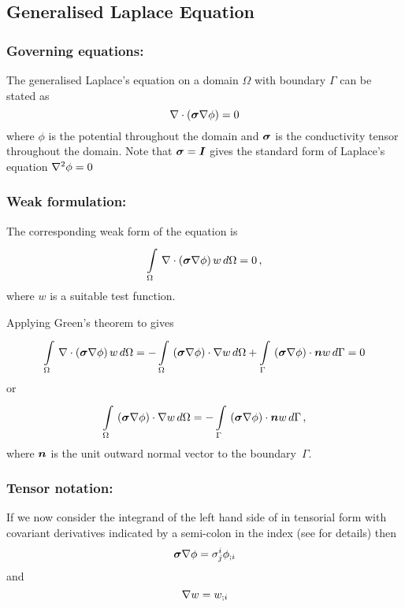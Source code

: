 \subsection{Generalised Laplace Equation}

\subsubsection{Governing equations:}
The generalised Laplace's equation on a domain $\Omega$ with boundary $\Gamma$
can be stated as
\begin{equation}
   \nabla\cdot\left( \boldsymbol{\sigma}\nabla \phi \right) =0
  \label{eqn:Laplacesequation}
\end{equation}
where $\phi$ is the potential throughout the domain and $\boldsymbol{\sigma}$ is
the conductivity tensor throughout the domain. Note that 
$\boldsymbol{\sigma}=\boldsymbol{I}$ gives the standard form of Laplace's equation \ie $\nabla^{2} {\phi}=0$

\subsubsection{Weak formulation:}
The corresponding weak form of the equation  is
\begin{equation}
    \displaystyle\int\limits_{\Omega}^{} \, \nabla\cdot\left( \boldsymbol{\sigma}\nabla \phi \right) w\,d\Omega =0 \,,
  \label{eqn:Laplaceweakform}
\end{equation}
where $w$ is a suitable test function.

Applying Green's theorem to  gives
\begin{equation}
 \gint{\Omega}{}{\diverg{\pbrac{\tensor{\sigma}\gradient{\phi}}}w}{\Omega}
 = -\gint{\Omega}{}{\dotprod{\pbrac{\tensor{\sigma}\gradient{\phi}}}{\gradient{w}}}{\Omega}
   +\gint{\Gamma}{}{\dotprod{\pbrac{\tensor{\sigma}\gradient{\phi}}}{\vect{n}}w}{\Gamma}
 = 0
\end{equation}
or
\begin{equation}
  \gint{\Omega}{}{\dotprod{\pbrac{\tensor{\sigma}\gradient{\phi}}}{\gradient{w}}}{\Omega}
  = -\gint{\Gamma}{}{\dotprod{\pbrac{\tensor{\sigma}\gradient{\phi}}}{\vect{n}w}}{\Gamma} \,,
  \label{eqn:Laplaceweightedresidualform}
\end{equation}
where $\vect{n}$ is the unit outward normal vector to the boundary~$\Gamma$.

\subsubsection{Tensor notation:}
If we now consider the integrand of the left hand side of
 in tensorial form with covariant
derivatives indicated by a semi-colon in the index
(see  for details) then
\begin{equation}
  \boldsymbol{\sigma}\nabla \phi = \sigma^{i}_{j} {\phi}_{;i} 
  \label{eqn:Laplace weak form factor1}
\end{equation}
and
\begin{equation}
  \nabla w =  {w}_{;i} 
  \label{eqn:Laplace weak form factor2}
\end{equation}

